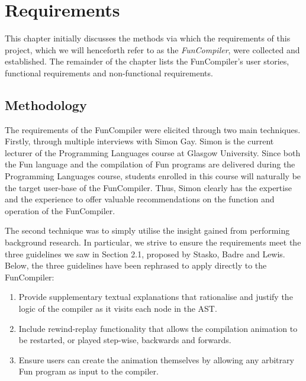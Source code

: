 \documentclass{l4proj}
\begin{document}
\chapter{Requirements}
This chapter initially discusses the methods via which the requirements of this project, which we will henceforth refer to as the \textit{FunCompiler}, were collected and established. The remainder of the chapter lists the FunCompiler's user stories, functional requirements and non-functional requirements.

\section{Methodology}
The requirements of the FunCompiler were elicited through two main techniques. Firstly, through multiple interviews with Simon Gay. Simon is the current lecturer of the Programming Languages course at Glasgow University. Since both the Fun language and the compilation of Fun programs are delivered during the Programming Languages course, students enrolled in this course will naturally be the target user-base of the FunCompiler. Thus, Simon clearly has the expertise and the experience to offer valuable recommendations on the function and operation of the FunCompiler.

The second technique was to simply utilise the insight gained from performing background research. In particular, we strive to ensure the requirements meet the three guidelines we saw in Section 2.1, proposed by Stasko, Badre and Lewis. Below, the three guidelines have been rephrased to apply directly to the FunCompiler:
\begin{enumerate}[label=Guideline \alph*)]
\item Provide supplementary textual explanations that rationalise and justify the logic of the compiler as it visits each node in the AST.
\item Include rewind-replay functionality that allows the compilation animation to be restarted, or played step-wise, backwards and forwards.
\item Ensure users can create the animation themselves by allowing any arbitrary Fun program as input to the compiler.
\end{enumerate}
\pagebreak
\end{document}
